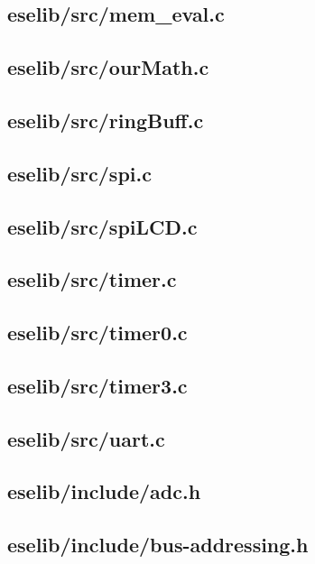 \documentclass[12pt,a4paper,titlepage,oneside]{article}
\begin{document}
\subsection{eselib/src/mem\_eval.c}

\newpage
\subsection{eselib/src/ourMath.c}

\newpage
\subsection{eselib/src/ringBuff.c}

\newpage
\subsection{eselib/src/spi.c}

\newpage
\subsection{eselib/src/spiLCD.c}

\newpage
\subsection{eselib/src/timer.c}

\newpage
\subsection{eselib/src/timer0.c}

\newpage
\subsection{eselib/src/timer3.c}

\newpage
\subsection{eselib/src/uart.c}

\newpage

\subsection{eselib/include/adc.h}

\newpage
\subsection{eselib/include/bus-addressing.h}

\newpage
\end{document}
